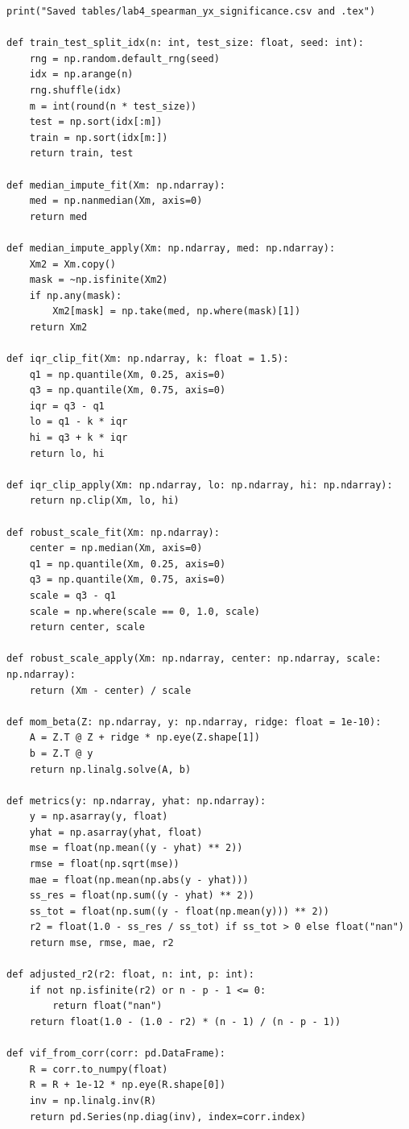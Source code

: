 \documentclass[a4paper, 14pt]{extarticle}
\begin{document}
\begin{longlisting}
\begin{verbatim}
print("Saved tables/lab4_spearman_yx_significance.csv and .tex")

def train_test_split_idx(n: int, test_size: float, seed: int):
    rng = np.random.default_rng(seed)
    idx = np.arange(n)
    rng.shuffle(idx)
    m = int(round(n * test_size))
    test = np.sort(idx[:m])
    train = np.sort(idx[m:])
    return train, test

def median_impute_fit(Xm: np.ndarray):
    med = np.nanmedian(Xm, axis=0)
    return med

def median_impute_apply(Xm: np.ndarray, med: np.ndarray):
    Xm2 = Xm.copy()
    mask = ~np.isfinite(Xm2)
    if np.any(mask):
        Xm2[mask] = np.take(med, np.where(mask)[1])
    return Xm2

def iqr_clip_fit(Xm: np.ndarray, k: float = 1.5):
    q1 = np.quantile(Xm, 0.25, axis=0)
    q3 = np.quantile(Xm, 0.75, axis=0)
    iqr = q3 - q1
    lo = q1 - k * iqr
    hi = q3 + k * iqr
    return lo, hi

def iqr_clip_apply(Xm: np.ndarray, lo: np.ndarray, hi: np.ndarray):
    return np.clip(Xm, lo, hi)

def robust_scale_fit(Xm: np.ndarray):
    center = np.median(Xm, axis=0)
    q1 = np.quantile(Xm, 0.25, axis=0)
    q3 = np.quantile(Xm, 0.75, axis=0)
    scale = q3 - q1
    scale = np.where(scale == 0, 1.0, scale)
    return center, scale

def robust_scale_apply(Xm: np.ndarray, center: np.ndarray, scale: np.ndarray):
    return (Xm - center) / scale

def mom_beta(Z: np.ndarray, y: np.ndarray, ridge: float = 1e-10):
    A = Z.T @ Z + ridge * np.eye(Z.shape[1])
    b = Z.T @ y
    return np.linalg.solve(A, b)

def metrics(y: np.ndarray, yhat: np.ndarray):
    y = np.asarray(y, float)
    yhat = np.asarray(yhat, float)
    mse = float(np.mean((y - yhat) ** 2))
    rmse = float(np.sqrt(mse))
    mae = float(np.mean(np.abs(y - yhat)))
    ss_res = float(np.sum((y - yhat) ** 2))
    ss_tot = float(np.sum((y - float(np.mean(y))) ** 2))
    r2 = float(1.0 - ss_res / ss_tot) if ss_tot > 0 else float("nan")
    return mse, rmse, mae, r2

def adjusted_r2(r2: float, n: int, p: int):
    if not np.isfinite(r2) or n - p - 1 <= 0:
        return float("nan")
    return float(1.0 - (1.0 - r2) * (n - 1) / (n - p - 1))

def vif_from_corr(corr: pd.DataFrame):
    R = corr.to_numpy(float)
    R = R + 1e-12 * np.eye(R.shape[0])
    inv = np.linalg.inv(R)
    return pd.Series(np.diag(inv), index=corr.index)



\end{verbatim}
\end{longlisting}
\end{document}
